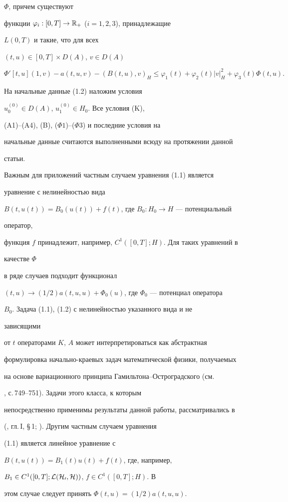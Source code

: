 $\Phi$, причем существуют 


функции $\varphi_i:[0,T]\to\Bbb R_+$ ($i=1,2,3$), принадлежащие 


$L(0,T)$ и такие, что для всех 


$(t,u)\in[0,T]\times D(A)$, $v\in D(A)$


$$


\Phi'[t,u](1,v)-a(t,u,v)-(B(t,u),v)_H\le\varphi_1(t)+ 


\varphi_2(t)|v|^2_H+\varphi_3(t)\Phi(t,u). 


$$


 


На начальные данные (1.2) наложим условия 


$u^{(0)}_0\in D(A)$, $u^{(0)}_1\in H_0$. Все условия (K), 


(A1)--(A4), (B), ($\Phi 1$)--($\Phi 3$) и последние условия на 


начальные данные считаются выполненными всюду на протяжении данной 


статьи. 


 


\begin{notenonum} 


Важным для приложений частным случаем уравнения (1.1) является 


уравнение с нелинейностью вида 


$B(t,u(t))=B_0(u(t))+f(t)$, где $B_0:H_0\to H$ --- потенциальный 


оператор, 


функция $f$ принадлежит, например, $C^1([0,T];H)$. Для таких уравнений в 


качестве $\Phi$ 


в ряде случаев подходит функционал 


$(t,u)\to(1/2)a(t,u,u)+\Phi_0(u)$, где $\Phi_0$ --- потенциал оператора 


$B_0$. Задача (1.1), (1.2) с нелинейностью указанного вида и не 


зависящими 


от $t$ операторами $K$, $A$ может интерпретироваться как абстрактная 


формулировка начально-краевых задач математической физики, получаемых 


на основе вариационного принципа Гамильтона--Остроградского (см. 


\cite{10}, с.\,749--751). Задачи этого класса, к которым 


непосредственно применимы результаты данной работы, рассматривались в 


(\cite{12}, гл.\,I, \S\,1; \cite{13}). Другим частным случаем уравнения 


(1.1) является линейное уравнение с 


$B(t,u(t))=B_1(t)u(t)+f(t)$, где, например, 


$B_1\in C^1([0,T];\cal L(H_0,H))$, $f\in C^1([0,T];H)$. В 


этом случае следует принять $\Phi(t,u)=(1/2)a(t,u,u)$. 


\end{notenonum} 


